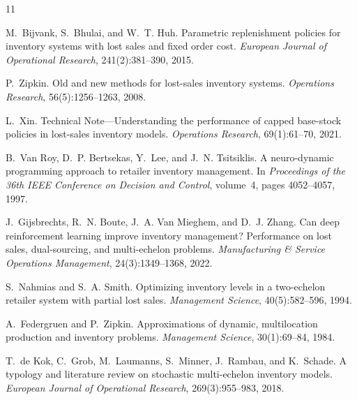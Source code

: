\documentclass[11pt]{article}
\begin{document}
\begin{thebibliography}{11}

M.~Bijvank, S.~Bhulai, and W.~T. Huh.
Parametric replenishment policies for inventory systems with lost sales and fixed order cost.
\emph{European Journal of Operational Research}, 241(2):381--390, 2015.

P.~Zipkin.
Old and new methods for lost-sales inventory systems.
\emph{Operations Research}, 56(5):1256--1263, 2008.

L.~Xin.
Technical Note---Understanding the performance of capped base-stock policies in lost-sales inventory models.
\emph{Operations Research}, 69(1):61--70, 2021.

B.~Van Roy, D.~P. Bertsekas, Y.~Lee, and J.~N. Tsitsiklis.
A neuro-dynamic programming approach to retailer inventory management.
In \emph{Proceedings of the 36th IEEE Conference on Decision and Control}, volume~4, pages 4052--4057, 1997.

J.~Gijsbrechts, R.~N. Boute, J.~A. Van Mieghem, and D.~J. Zhang.
Can deep reinforcement learning improve inventory management? Performance on lost sales, dual-sourcing, and multi-echelon problems.
\emph{Manufacturing \& Service Operations Management}, 24(3):1349--1368, 2022.

S.~Nahmias and S.~A. Smith.
Optimizing inventory levels in a two-echelon retailer system with partial lost sales.
\emph{Management Science}, 40(5):582--596, 1994.

A.~Federgruen and P.~Zipkin.
Approximations of dynamic, multilocation production and inventory problems.
\emph{Management Science}, 30(1):69--84, 1984.

T.~de Kok, C.~Grob, M.~Laumanns, S.~Minner, J.~Rambau, and K.~Schade.
A typology and literature review on stochastic multi-echelon inventory models.
\emph{European Journal of Operational Research}, 269(3):955--983, 2018.


\end{thebibliography}
\end{document}
